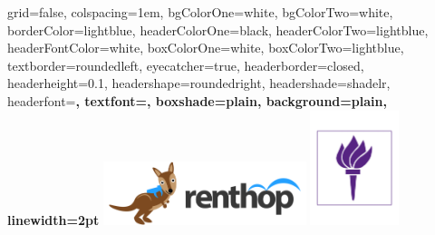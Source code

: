 \documentclass[landscape,final,a0paper,fontscale=0.285]{baposter}
\begin{document}
\begin{poster}%
  {
  grid=false,
  colspacing=1em,
  bgColorOne=white,
  bgColorTwo=white,
  borderColor=lightblue,
  headerColorOne=black,
  headerColorTwo=lightblue,
  headerFontColor=white,
  boxColorOne=white,
  boxColorTwo=lightblue,
  textborder=roundedleft,
  eyecatcher=true,
  headerborder=closed,
  headerheight=0.1\textheight,
  headershape=roundedright,
  headershade=shadelr,
  headerfont=\Large\bf\textsc, %
  textfont={\setlength{\parindent}{1.5em}},
  boxshade=plain,
  background=plain,
  linewidth=2pt
  }
  {\includegraphics[height=5em]{images/rent-hop.png}} 
  {\bf{}\vspace{0.5em}}
  {}
  {%
    \includegraphics[height=9.0em]{images/NYU.pdf}
  }

    \newcommand{\colouredcircle}{%
      \tikz{\useasboundingbox (-0.2em,-0.32em) rectangle(0.2em,0.32em); \draw[draw=black,fill=lightblue,line width=0.03em] (0,0) circle(0.18em);}}


\end{poster}
\end{document}
